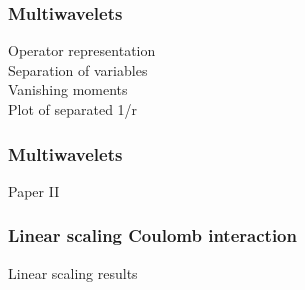 \documentclass[mathserif]{beamer}
\begin{document}
\begin{frame}
\end{frame}

\begin{frame}
    \frametitle{Multiwavelets}
    Operator representation\\
    Separation of variables\\
    Vanishing moments\\
    Plot of separated 1/r
\end{frame}

\begin{frame}
    \frametitle{Multiwavelets}
    Paper II
\end{frame}

\begin{frame}
    \frametitle{Linear scaling Coulomb interaction}
    Linear scaling results
\end{frame}
\end{document}

